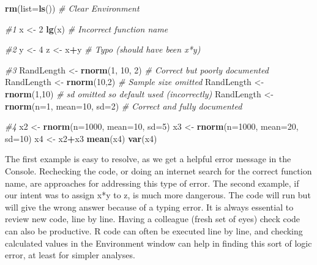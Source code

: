 \documentclass[
]{krantz}
\makeatletter
\newenvironment{Shaded}{\begin{snugshade}}{\end{snugshade}}
\newcommand{\AttributeTok}[1]{\textcolor[rgb]{0.27,0.27,0.27}{#1}}
\newcommand{\CommentTok}[1]{\textcolor[rgb]{0.37,0.37,0.37}{\textit{#1}}}
\newcommand{\DecValTok}[1]{\textcolor[rgb]{0.06,0.06,0.06}{#1}}
\newcommand{\FunctionTok}[1]{\textcolor[rgb]{0.27,0.27,0.27}{\textbf{#1}}}
\newcommand{\NormalTok}[1]{#1}
\newcommand{\OtherTok}[1]{\textcolor[rgb]{0.37,0.37,0.37}{#1}}
\newcommand{\SpecialCharTok}[1]{\textcolor[rgb]{0.43,0.43,0.43}{\textbf{#1}}}
\newenvironment{kframe}{%
\medskip{}
\setlength{\fboxsep}{.8em}
 \def\at@end@of@kframe{}%
 \ifinner\ifhmode%
  \def\at@end@of@kframe{\end{minipage}}%
  \begin{minipage}{\columnwidth}%
 \fi\fi%
 \def\FrameCommand##1{\hskip\@totalleftmargin \hskip-\fboxsep
 \colorbox{shadecolor}{##1}\hskip-\fboxsep
     \hskip-\linewidth \hskip-\@totalleftmargin \hskip\columnwidth}%
 \MakeFramed {\advance\hsize-\width
   \@totalleftmargin\z@ \linewidth\hsize
   \@setminipage}}%
 {\par\unskip\endMakeFramed%
 \at@end@of@kframe}
\renewenvironment{Shaded}{\begin{kframe}}{\end{kframe}}
\makeatother
\begin{document}
\begin{Shaded}
\begin{Highlighting}[]
\FunctionTok{rm}\NormalTok{(}\AttributeTok{list=}\FunctionTok{ls}\NormalTok{()) }\CommentTok{\# Clear Environment}

\CommentTok{\#1}
\NormalTok{x }\OtherTok{\textless{}{-}} \DecValTok{2}
\FunctionTok{lg}\NormalTok{(x) }\CommentTok{\# Incorrect function name}

\CommentTok{\#2}
\NormalTok{y }\OtherTok{\textless{}{-}} \DecValTok{4}
\NormalTok{z }\OtherTok{\textless{}{-}}\NormalTok{ x}\SpecialCharTok{+}\NormalTok{y }\CommentTok{\# Typo (should have been x*y)}

\CommentTok{\#3}
\NormalTok{RandLength }\OtherTok{\textless{}{-}} \FunctionTok{rnorm}\NormalTok{(}\DecValTok{1}\NormalTok{, }\DecValTok{10}\NormalTok{, }\DecValTok{2}\NormalTok{) }\CommentTok{\# Correct but poorly documented}
\NormalTok{RandLength }\OtherTok{\textless{}{-}} \FunctionTok{rnorm}\NormalTok{(}\DecValTok{10}\NormalTok{,}\DecValTok{2}\NormalTok{) }\CommentTok{\# Sample size omitted}
\NormalTok{RandLength }\OtherTok{\textless{}{-}} \FunctionTok{rnorm}\NormalTok{(}\DecValTok{1}\NormalTok{,}\DecValTok{10}\NormalTok{) }\CommentTok{\# sd omitted so default used (incorrectly)}
\NormalTok{RandLength }\OtherTok{\textless{}{-}} \FunctionTok{rnorm}\NormalTok{(}\AttributeTok{n=}\DecValTok{1}\NormalTok{, }\AttributeTok{mean=}\DecValTok{10}\NormalTok{, }\AttributeTok{sd=}\DecValTok{2}\NormalTok{) }\CommentTok{\# Correct and fully documented}

\CommentTok{\#4}
\NormalTok{x2 }\OtherTok{\textless{}{-}} \FunctionTok{rnorm}\NormalTok{(}\AttributeTok{n=}\DecValTok{1000}\NormalTok{, }\AttributeTok{mean=}\DecValTok{10}\NormalTok{, }\AttributeTok{sd=}\DecValTok{5}\NormalTok{)}
\NormalTok{x3 }\OtherTok{\textless{}{-}} \FunctionTok{rnorm}\NormalTok{(}\AttributeTok{n=}\DecValTok{1000}\NormalTok{, }\AttributeTok{mean=}\DecValTok{20}\NormalTok{, }\AttributeTok{sd=}\DecValTok{10}\NormalTok{)}
\NormalTok{x4 }\OtherTok{\textless{}{-}}\NormalTok{ x2}\SpecialCharTok{+}\NormalTok{x3}
\FunctionTok{mean}\NormalTok{(x4)}
\FunctionTok{var}\NormalTok{(x4)}
\end{Highlighting}
\end{Shaded}

The first example is easy to resolve, as we get a helpful error message in the Console. Rechecking the code, or doing an internet search for the correct function name, are approaches for addressing this type of error. The second example, if our intent was to assign x*y to z, is much more dangerous. The code will run but will give the wrong answer because of a typing error. It is always essential to review new code, line by line. Having a colleague (fresh set of eyes) check code can also be productive. R code can often be executed line by line, and checking calculated values in the Environment window can help in finding this sort of logic error, at least for simpler analyses.
\end{document}
